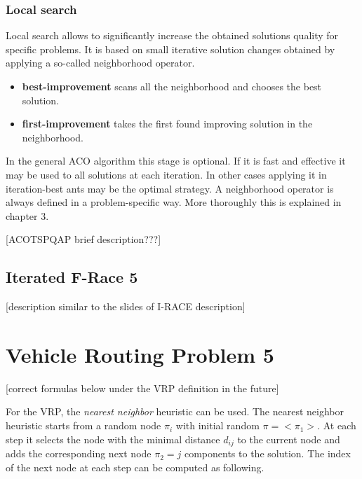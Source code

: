 \documentclass[11pt,a4paper,oneside]{book}
\begin{document}
\subsection{Local search}
Local search allows to significantly increase the obtained solutions quality for specific problems. It is based on small iterative solution changes obtained by applying a so-called neighborhood operator.

\begin{itemize}
\item \textbf{best-improvement} scans all the neighborhood and chooses the best solution.
\item \textbf{first-improvement} takes the first found improving solution in the neighborhood.
\end{itemize}

In the general ACO algorithm this stage is optional. If it is fast and effective it may be used to all solutions at each iteration. In other cases applying it in iteration-best ants may be the optimal strategy. A neighborhood operator is always defined in a problem-specific way. More thoroughly this is explained in chapter 3.





[ACOTSPQAP brief description???] \newline

\section{Iterated F-Race 5}

[description similar to the slides of I-RACE description] \newline


\chapter{Vehicle Routing Problem 5}


[correct formulas below under the VRP definition in the future] \newline


For the VRP, the \emph{nearest neighbor} heuristic can be used. The nearest neighbor heuristic starts from a random node $\pi_i$ with initial random $\pi=<\pi_1>$. At each step it selects the node with the minimal distance $d_{ij}$ to the current node and adds the corresponding next node $\pi_2=j$ components to the solution. The index of the next node at each step can be computed as following.\\
\end{document}
